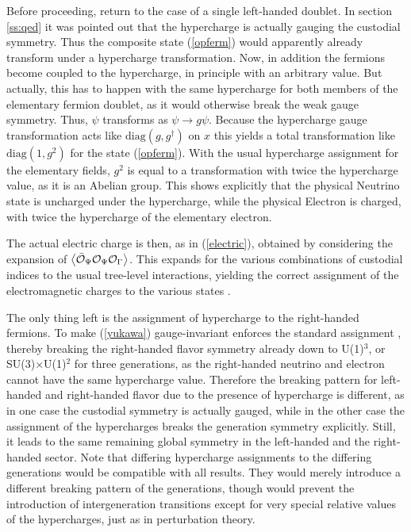 \documentclass[final,twoside,12pt]{article}
\newcommand*{\pref}[1]{(\ref{#1})}
\newcommand*{\diag}{\mathrm{diag}}
\newcommand*{\1}{1\!\!\!\bot}
\newcommand*{\la}{\left\langle}
\newcommand*{\ra}{\right\rangle}
\newcommand*{\op}{{\cal O}}
\begin{document}
Before proceeding, return to the case of a single left-handed doublet. In section \ref{ss:qed} it was pointed out that the hypercharge is actually gauging the custodial symmetry. Thus the composite state \pref{opferm} would apparently already transform under a hypercharge transformation. Now, in addition the fermions become coupled to the hypercharge, in principle with an arbitrary value. But actually, this has to happen with the same hypercharge for both members of the elementary fermion doublet, as it would otherwise break the weak gauge symmetry. Thus, $\psi$ transforms as $\psi\to g\psi$. Because the hypercharge gauge transformation acts like $\diag(g,g^\dagger)$ on $x$ this yields a total transformation like $\diag(1,g^2)$ for the state \pref{opferm}. With the usual hypercharge assignment for the elementary fields, $g^2$ is equal to a transformation with twice the hypercharge value, as it is an Abelian group. This shows explicitly that the physical Neutrino state is uncharged under the hypercharge, while the physical Electron is charged, with twice the hypercharge of the elementary electron.

The actual electric charge is then, as in \pref{electric}, obtained by considering the expansion of $\la\bar{\op}_\Psi\op_\Psi\op_\Gamma\ra$. This expands for the various combinations of custodial indices to the usual tree-level interactions, yielding the correct assignment of the electromagnetic charges to the various states \cite{Bohm:2001yx}.

The only thing left is the assignment of hypercharge to the right-handed fermions. To make \pref{yukawa} gauge-invariant enforces the standard assignment \cite{Bohm:2001yx}, thereby breaking the right-handed flavor symmetry already down to U(1)$^3$, or SU(3)$\times$U(1)$^2$ for three generations, as the right-handed neutrino and electron cannot have the same hypercharge value. Therefore the breaking pattern for left-handed and right-handed flavor due to the presence of hypercharge is different, as in one case the custodial symmetry is actually gauged, while in the other case the assignment of the hypercharges breaks the generation symmetry explicitly. Still, it leads to the same remaining global symmetry in the left-handed and the right-handed sector. Note that differing hypercharge assignments to the differing generations would be compatible with all results. They would merely introduce a different breaking pattern of the generations, though would prevent the introduction of intergeneration transitions except for very special relative values of the hypercharges, just as in perturbation theory.
\end{document}
